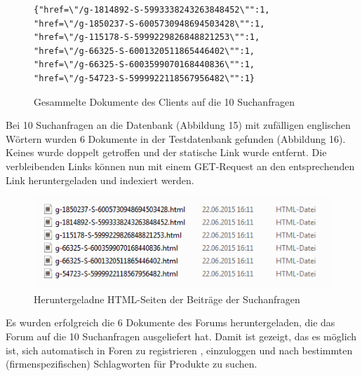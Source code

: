 \begin{figure}[h!]
\begin{lstlisting}[language=HTML5]
{"href=\"/g-1814892-S-5993338243263848452\"":1,
"href=\"/g-1850237-S-6005730948694503428\"":1,
"href=\"/g-115178-S-5999229826848821253\"":1,
"href=\"/g-66325-S-6001320511865446402\"":1,
"href=\"/g-66325-S-6003599070168440836\"":1,
"href=\"/g-54723-S-5999922118567956482\"":1}
\end{lstlisting}
\caption{Gesammelte Dokumente des Clients auf die 10 Suchanfragen}
\end{figure}

Bei 10 Suchanfragen an die Datenbank (Abbildung 15) mit zufälligen englischen Wörtern wurden 6 Dokumente in der Testdatenbank gefunden (Abbildung 16). Keines wurde doppelt getroffen und der statische Link wurde entfernt. Die verbleibenden Links können nun mit einem GET-Request an den entsprechenden Link heruntergeladen und indexiert werden.
\newpage

\begin{figure}[h!]
\includegraphics{./images/postdownload.png}
\caption{Heruntergeladne HTML-Seiten der Beiträge der Suchanfragen}
\end{figure}


Es wurden erfolgreich die 6 Dokumente des Forums heruntergeladen, die das Forum auf die 10 Suchanfragen ausgeliefert hat.
Damit ist gezeigt, das es möglich ist, sich automatisch in Foren zu registrieren , einzuloggen und nach bestimmten (firmenspezifischen) Schlagworten für Produkte zu suchen.

